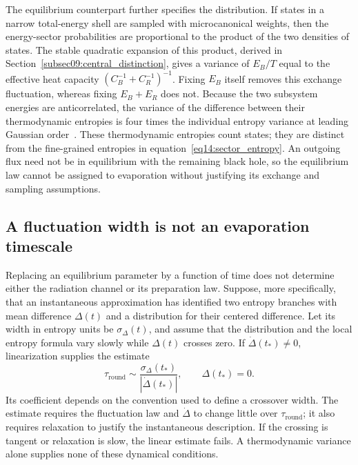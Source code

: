 \documentclass[11pt,letterpaper]{article}
\theoremstyle{plain}
\theoremstyle{definition}
\theoremstyle{remark}
\begin{document}
The equilibrium counterpart further specifies the distribution. If
states in a narrow total-energy shell are sampled with microcanonical
weights, then the energy-sector probabilities are proportional to the
product of the two densities of states. The stable quadratic expansion
of this product, derived in Section~\ref{subsec09:central_distinction},
gives a variance of $E_B/T$ equal to the effective heat capacity
$(C_B^{-1}+C_R^{-1})^{-1}$. Fixing $E_B$ itself removes this exchange
fluctuation, whereas fixing $E_B+E_R$ does not. Because the two
subsystem energies are anticorrelated, the variance of the difference
between their thermodynamic entropies is four times the individual
entropy variance at leading Gaussian order~\citep{wuebben2026paper2}.
These thermodynamic entropies count states; they are distinct from
the fine-grained entropies in equation~\eqref{eq14:sector_entropy}.
An outgoing flux need not be in equilibrium with the remaining black
hole, so the equilibrium law cannot be assigned to evaporation without
justifying its exchange and sampling assumptions.

\subsection{A fluctuation width is not an evaporation timescale}
\label{subsec14:instantaneous_approximation}

Replacing an equilibrium parameter by a function of time does not
determine either the radiation channel or its preparation law.
Suppose, more specifically, that an instantaneous approximation has
identified two entropy branches with mean difference $\Delta(t)$ and
a distribution for their centered difference. Let its width in entropy
units be $\sigma_\Delta(t)$, and assume that the distribution and the
local entropy formula vary slowly while $\Delta(t)$ crosses zero.
If $\dot\Delta(t_*)\ne0$, linearization supplies the estimate
\begin{equation}
 \tau_{\mathrm{round}}\sim
 \frac{\sigma_\Delta(t_*)}{|\dot\Delta(t_*)|},
 \qquad \Delta(t_*)=0.
 \label{eq14:time_width}
\end{equation}
Its coefficient depends on the convention used to define a crossover
width. The estimate requires the fluctuation law and
$\dot\Delta$ to change little over $\tau_{\mathrm{round}}$; it also
requires relaxation to justify the instantaneous description. If the
crossing is tangent or relaxation is slow, the linear estimate fails.
A thermodynamic variance alone supplies none of these dynamical
conditions.
\end{document}
